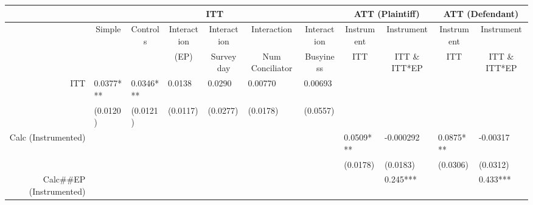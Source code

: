 \begin{tabular}{rrrrrrrrrrr}
\toprule
      & \multicolumn{6}{c}{ITT}                       & \multicolumn{2}{c}{ATT (Plaintiff)} & \multicolumn{2}{c}{ATT (Defendant)} \\
\midrule
\midrule
      & \multicolumn{1}{c}{Simple} & \multicolumn{1}{c}{Controls} & \multicolumn{1}{c}{Interaction} & \multicolumn{1}{c}{Interaction} & \multicolumn{1}{c}{Interaction} & \multicolumn{1}{c}{Interaction} & \multicolumn{1}{c}{Instrument} & \multicolumn{1}{c}{Instrument} & \multicolumn{1}{c}{Instrument} & \multicolumn{1}{c}{Instrument} \\
      \midrule
      & \multicolumn{1}{c}{} & \multicolumn{1}{c}{} & \multicolumn{1}{c}{(EP)} & \multicolumn{1}{c}{Survey day} & \multicolumn{1}{c}{Num Conciliator} & \multicolumn{1}{c}{Busyiness} & \multicolumn{1}{c}{ITT} & \multicolumn{1}{c}{ITT \& ITT*EP} & \multicolumn{1}{c}{ITT} & \multicolumn{1}{c}{ITT \& ITT*EP} \\
ITT   & \multicolumn{1}{l}{0.0377***} & \multicolumn{1}{l}{0.0346***} & \multicolumn{1}{l}{0.0138} & \multicolumn{1}{l}{0.0290} & \multicolumn{1}{l}{0.00770} & \multicolumn{1}{l}{0.00693} & \multicolumn{1}{l}{} & \multicolumn{1}{l}{} & \multicolumn{1}{l}{} & \multicolumn{1}{l}{} \\
      & \multicolumn{1}{l}{(0.0120)} & \multicolumn{1}{l}{(0.0121)} & \multicolumn{1}{l}{(0.0117)} & \multicolumn{1}{l}{(0.0277)} & \multicolumn{1}{l}{(0.0178)} & \multicolumn{1}{l}{(0.0557)} & \multicolumn{1}{l}{} & \multicolumn{1}{l}{} & \multicolumn{1}{l}{} & \multicolumn{1}{l}{} \\
Calc (Instrumented) & \multicolumn{1}{l}{} & \multicolumn{1}{l}{} & \multicolumn{1}{l}{} & \multicolumn{1}{l}{} & \multicolumn{1}{l}{} & \multicolumn{1}{l}{} & \multicolumn{1}{l}{0.0509***} & \multicolumn{1}{l}{-0.000292} & \multicolumn{1}{l}{0.0875***} & \multicolumn{1}{l}{-0.00317} \\
      & \multicolumn{1}{l}{} & \multicolumn{1}{l}{} & \multicolumn{1}{l}{} & \multicolumn{1}{l}{} & \multicolumn{1}{l}{} & \multicolumn{1}{l}{} & \multicolumn{1}{l}{(0.0178)} & \multicolumn{1}{l}{(0.0183)} & \multicolumn{1}{l}{(0.0306)} & \multicolumn{1}{l}{(0.0312)} \\
Calc\#\#EP (Instrumented) & \multicolumn{1}{l}{} & \multicolumn{1}{l}{} & \multicolumn{1}{l}{} & \multicolumn{1}{l}{} & \multicolumn{1}{l}{} & \multicolumn{1}{l}{} & \multicolumn{1}{l}{} & \multicolumn{1}{l}{0.245***} & \multicolumn{1}{l}{} & \multicolumn{1}{l}{0.433***} \\

\end{tabular}
